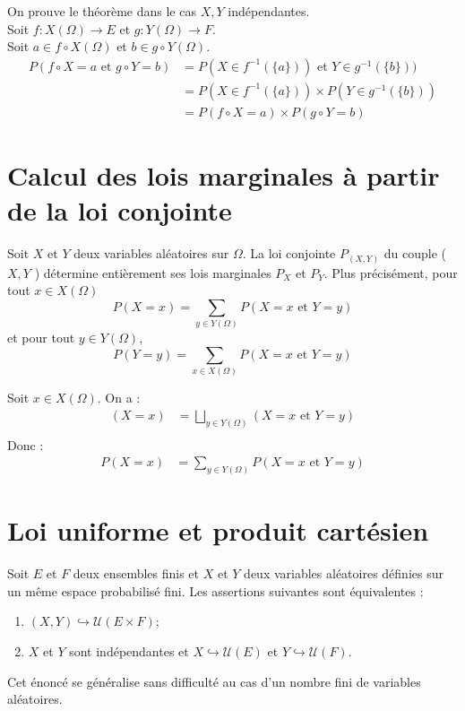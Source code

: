 \documentclass[../main.tex]{subfiles}
\begin{document}
\noindent On prouve le théorème dans le cas $X, Y$ indépendantes. \\
Soit $f:X(\Omega)\to E$ et $g:Y(\Omega)\to F$. \\
Soit $a\in f \circ X(\Omega)$ et $b\in g \circ Y(\Omega)$. 
\begin{align*}
    P(f\circ X = a \text{ et } g\circ Y = b) &= P(X\in f^{-1}(\{a\})) \text{ et } Y\in g^{-1}(\{b\})) \\
    &= P(X\in f^{-1}(\{a\})) \times P(Y\in g^{-1}(\{b\})) \\
    &= P(f\circ X = a) \times P(g\circ Y = b)
\end{align*}

\section{Calcul des lois marginales à partir de la loi conjointe}
\begin{tcolorbox}[title=Théorème 32.61, title filled=false, colframe=orange, colback=orange!10!white]
    Soit $X$ et $Y$ deux variables aléatoires sur $\Omega$. La loi conjointe $P_{(X, Y)}$ du couple ( $X, Y$ ) détermine entièrement ses lois marginales $P_X$ et $P_Y$. Plus précisément, pour tout $x \in X(\Omega)$
    $$P(X=x)=\sum_{y \in Y(\Omega)} P(X=x \text { et } Y=y)$$
    et pour tout $y \in Y(\Omega)$,
    $$P(Y=y)=\sum_{x \in X(\Omega)} P(X=x \text { et } Y=y)$$
\end{tcolorbox}

\noindent Soit $x\in X(\Omega)$. On a :
\begin{align*}
    (X = x) &= \bigsqcup_{y\in Y(\Omega)} (X = x \text{ et } Y = y) \\
\end{align*}
Donc : 
\begin{align*}
    P(X = x) &= \sum_{y\in Y(\Omega)} P(X = x \text{ et } Y = y)
\end{align*}

\section{Loi uniforme et produit cartésien}
\begin{tcolorbox}[title=Théorème 32.63, title filled=false, colframe=orange, colback=orange!10!white]
    Soit $E$ et $F$ deux ensembles finis et $X$ et $Y$ deux variables aléatoires définies sur un même espace probabilisé fini. Les assertions suivantes sont équivalentes :
    \begin{enumerate}
        \item $(X, Y) \hookrightarrow \mathcal{U}(E \times F)$;
        \item $X$ et $Y$ sont indépendantes et $X \hookrightarrow \mathcal{U}(E)$ et $Y \hookrightarrow \mathcal{U}(F)$.
    \end{enumerate}
Cet énoncé se généralise sans difficulté au cas d'un nombre fini de variables aléatoires.
\end{tcolorbox}
\end{document}
